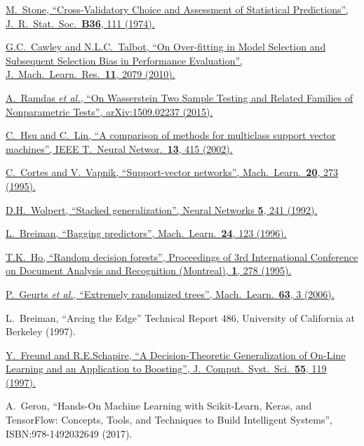\href{http://www.jstor.org/stable/2984809}{M.~Stone, \enquote{Cross-Validatory Choice and Assessment of Statistical Predictions}, J.\ R.\ Stat.\ Soc.\ \textbf{B36}, 111 (1974).}

\href{http://www.jmlr.org/papers/volume11/cawley10a/cawley10a.pdf}{G.C.~Cawley and N.L.C.~Talbot, \enquote{On Over-fitting in Model Selection and Subsequent Selection Bias in Performance Evaluation}, J.\ Mach.\ Learn.\ Res.\ \textbf{11}, 2079 (2010).}

\href{https://arxiv.org/abs/1509.02237v2}{A.~Ramdas \textit{et al.}, \enquote{On Wasserstein Two Sample Testing and Related Families of Nonparametric Tests}, arXiv:1509.02237 (2015).}

\href{https://doi.org/10.1109/72.991427}{C.~Hsu and C.~Lin, \enquote{A comparison of methods for multiclass support vector machines}, IEEE T.\ Neural Networ.\ \textbf{13}, 415 (2002).}

\href{https://doi.org/10.1007/BF00994018}{C.~Cortes and V.~Vapnik, \enquote{Support-vector networks}, Mach.\ Learn.\ \textbf{20}, 273 (1995).}

\href{https://doi.org/10.1016/S0893-6080(05)80023-1}{D.H.~Wolpert, \enquote{Stacked generalization}, Neural Networks \textbf{5}, 241 (1992).}

\href{https://doi.org/10.1023/A:1018054314350}{L.~Breiman, \enquote{Bagging predictors}, Mach.\ Learn.\ \textbf{24}, 123 (1996).}

\href{https://doi.org/10.1109/ICDAR.1995.598994}{T.K.~Ho, \enquote{Random decision forests}, Proceedings of 3rd International Conference on Document Analysis and Recognition (Montreal), \textbf{1}, 278 (1995).}

\href{https://doi.org/10.1007/s10994-006-6226-1}{P.~Geurts \textit{et al.}, \enquote{Extremely randomized trees}, Mach.\ Learn.\ \textbf{63}, 3 (2006).}

L.~Breiman, \enquote{Arcing the Edge} Technical Report 486, University of California at Berkeley (1997).

\href{https://doi.org/10.1006/jcss.1997.1504}{Y.~Freund and R.E.Schapire, \enquote{A Decision-Theoretic Generalization of On-Line Learning and an Application to Boosting}, J.\ Comput.\ Syst.\ Sci.\ \textbf{55}, 119 (1997).}

A.~Geron, \enquote{Hands-On Machine Learning with Scikit-Learn, Keras, and TensorFlow: Concepts, Tools, and Techniques to Build Intelligent Systems}, ISBN:978-1492032649 (2017).

